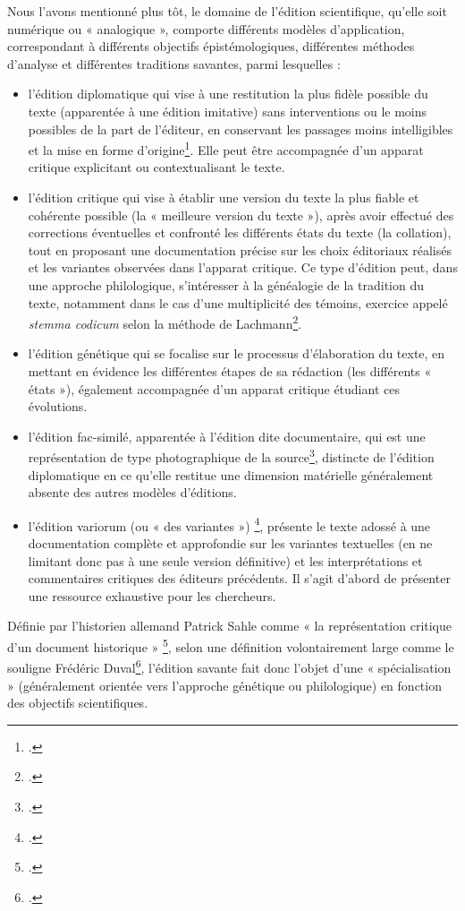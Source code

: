 Nous l’avons mentionné plus tôt, le domaine de l’édition scientifique, qu’elle soit numérique ou « analogique », comporte différents modèles d’application, correspondant à différents objectifs épistémologiques, différentes méthodes d’analyse et différentes traditions savantes, parmi lesquelles :
\begin{itemize}
\item l’édition diplomatique qui vise à une restitution la plus fidèle possible du texte (apparentée à une édition imitative) sans interventions ou le moins possibles de la part de l’éditeur, en conservant les passages moins intelligibles et la mise en forme d’origine\footcite[p.178]{masai_principes_1950}. Elle peut être accompagnée d’un apparat critique explicitant ou contextualisant le texte.

\item l’édition critique qui vise à établir une version du texte la plus fiable et cohérente possible (la « meilleure version du texte »), après avoir effectué des corrections éventuelles et confronté les différents états du texte (la collation), tout en proposant une documentation précise sur les choix éditoriaux réalisés et les variantes observées dans l’apparat critique. Ce type d’édition peut, dans une approche philologique, s’intéresser à la généalogie de la tradition du texte, notamment dans le cas d’une multiplicité des témoins, exercice appelé \textit{stemma codicum} selon la méthode de Lachmann\footcite[p.125-138]{fornaro_karl_2011}.

\item l’édition génétique qui se focalise sur le processus d’élaboration du texte, en mettant en évidence les différentes étapes de sa rédaction (les différents « états »), également accompagnée d’un apparat critique étudiant ces évolutions.

\item l’édition fac-similé, apparentée à l’édition dite documentaire, qui est une représentation de type photographique de la source\footcite[p.178]{masai_principes_1950}, distincte de l’édition diplomatique en ce qu’elle restitue une dimension matérielle généralement absente des autres modèles d’éditions.

\item l’édition variorum (ou « des variantes ») \footcite[p.82]{chateau-dutier_editions_2021}, présente le texte adossé à une documentation complète et approfondie sur les variantes textuelles (en ne limitant donc pas à une seule version définitive) et les interprétations et commentaires critiques des éditeurs précédents. Il s’agit d’abord de présenter une ressource exhaustive pour les chercheurs.
\end{itemize}
Définie par l’historien allemand Patrick Sahle comme « la représentation critique d’un document historique » \footcite{sahle_what_2016}, selon une définition volontairement large comme le souligne Frédéric Duval\footcite[p.15]{duval_pour_2017}, l’édition savante fait donc l’objet d’une « spécialisation » (généralement orientée vers l’approche génétique ou philologique) en fonction des objectifs scientifiques.

